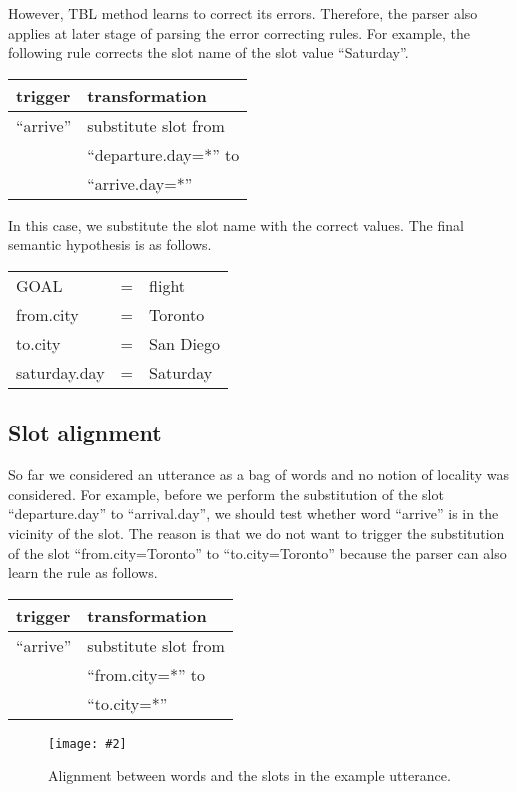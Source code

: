 \documentclass{article}
\newcommand{\fgrparam}[4]{
  \begin{figure}[htbp]
    \begin{center}
      \leavevmode
      \texttt{[image: \#2]}
    \end{center}
    \caption{#4}
    \label{#3}
  \end{figure}
}
\begin{document}
However, TBL method learns to correct its errors. Therefore, the parser also applies at later stage of parsing the error correcting rules. For example, the following rule corrects the slot name of the slot value ``Saturday''.

\vspace{.25cm}
\begin{tabular}{ll}
  trigger & transformation \\
  \hline 
  ``arrive''            & substitute slot from\\
                        & ``departure.day=*'' to \\
                        & ``arrive.day=*'' \\
\end{tabular} 
\vspace{.25cm}

In this case, we substitute the slot name with the correct values. The final semantic hypothesis is as follows.

\vspace{.25cm}
\begin{tabular}{lll}
  GOAL          & = & flight \\
  from.city     & = & Toronto \\
  to.city       & = & San Diego \\
  saturday.day & = & Saturday \\
\end{tabular} 
\vspace{.25cm}

\subsection{Slot alignment}

So far we considered an utterance as a bag of words and no notion of locality was considered. For example, before we perform the substitution of the slot ``departure.day'' to ``arrival.day'', we should test whether word ``arrive'' is in the vicinity of the slot. The reason is that we do not want to trigger the substitution of the slot ``from.city=Toronto'' to ``to.city=Toronto'' because the parser can also learn the rule as follows. 

\vspace{.25cm}
\begin{tabular}{ll}
  trigger & transformation \\
  \hline 
  ``arrive''            & substitute slot from\\
                        & ``from.city=*'' to \\
                        & ``to.city=*'' \\
\end{tabular} 
\vspace{.25cm}
\fgrparam{width=8cm}{./fig/words-slots-alignment.pdf}{fig:alignment}{Alignment between words and the slots in the example utterance.}
\end{document}
